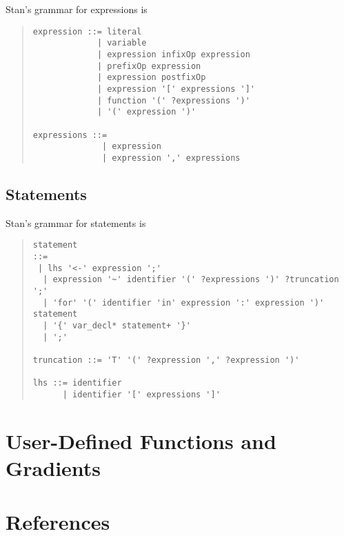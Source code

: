 \documentclass[10pt]{report}
\newcommand{\Stan}{Stan\xspace}
\begin{document}
\Stan's grammar for expressions is 
%
\begin{quote}
\begin{Verbatim}
expression ::= literal
             | variable
             | expression infixOp expression
             | prefixOp expression
             | expression postfixOp
             | expression '[' expressions ']'
             | function '(' ?expressions ')'
             | '(' expression ')'

expressions ::= 
              | expression
              | expression ',' expressions
\end{Verbatim}
\end{quote}

\section{Statements}

\Stan's grammar for statements is
%
\begin{quote}
\begin{Verbatim}
statement 
::= 
 | lhs '<-' expression ';'
  | expression '~' identifier '(' ?expressions ')' ?truncation ';'
  | 'for' '(' identifier 'in' expression ':' expression ')' statement
  | '{' var_decl* statement+ '}'
  | ';'

truncation ::= 'T' '(' ?expression ',' ?expression ')' 

lhs ::= identifier
      | identifier '[' expressions ']'

\end{Verbatim}
\end{quote}



\chapter{User-Defined Functions and Gradients}\label{user-defined-functions.appendix}




\chapter*{References}
\end{document}
